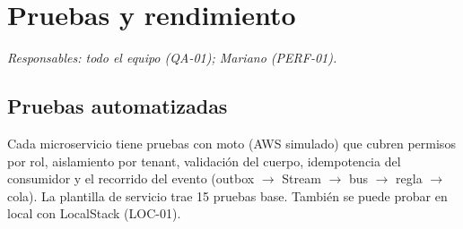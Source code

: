 \section{Pruebas y rendimiento}
\label{sec:pruebas}
\textit{Responsables: todo el equipo (QA-01); Mariano (PERF-01).}

\subsection{Pruebas automatizadas}
Cada microservicio tiene pruebas con moto (AWS simulado) que cubren permisos por rol, aislamiento por
tenant, validación del cuerpo, idempotencia del consumidor y el recorrido del evento
(outbox $\rightarrow$ Stream $\rightarrow$ bus $\rightarrow$ regla $\rightarrow$ cola). La plantilla de
servicio trae 15 pruebas base. También se puede probar en local con LocalStack (LOC-01).

